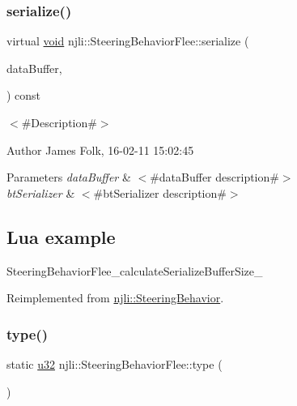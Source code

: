 \subsubsection{\texorpdfstring{serialize()}{serialize()}}
{\footnotesize\ttfamily virtual \mbox{\hyperlink{_thread_8h_af1e856da2e658414cb2456cb6f7ebc66}{void}} njli\+::\+Steering\+Behavior\+Flee\+::serialize (\begin{DoxyParamCaption}\item[{\mbox{\hyperlink{_thread_8h_af1e856da2e658414cb2456cb6f7ebc66}{void}} $\ast$}]{data\+Buffer,  }\item[{bt\+Serializer $\ast$}]{ }\end{DoxyParamCaption}) const\hspace{0.3cm}{\ttfamily [virtual]}}



$<$\#\+Description\#$>$ 

\begin{DoxyAuthor}{Author}
James Folk, 16-\/02-\/11 15\+:02\+:45
\end{DoxyAuthor}

\begin{DoxyParams}{Parameters}
{\em data\+Buffer} & $<$\#data\+Buffer description\#$>$ \\
\hline
{\em bt\+Serializer} & $<$\#bt\+Serializer description\#$>$\\
\hline
\end{DoxyParams}
\hypertarget{classnjli_1_1_steering_behavior_wander_ex1}{}\subsection{Lua example}\label{classnjli_1_1_steering_behavior_wander_ex1}

\begin{DoxyCodeInclude}
\end{DoxyCodeInclude}
Steering\+Behavior\+Flee\+\_\+calculate\+Serialize\+Buffer\+Size\+\_\+ 

Reimplemented from \mbox{\hyperlink{classnjli_1_1_steering_behavior_aa8494cb4a327c0040f64cfe8b393786e}{njli\+::\+Steering\+Behavior}}.

\mbox{\label{classnjli_1_1_steering_behavior_flee_a38a803a3d1269dd2c3ae09d1272156c8}} 
\subsubsection{\texorpdfstring{type()}{type()}}
{\footnotesize\ttfamily static \mbox{\hyperlink{_util_8h_a10e94b422ef0c20dcdec20d31a1f5049}{u32}} njli\+::\+Steering\+Behavior\+Flee\+::type (\begin{DoxyParamCaption}{ }\end{DoxyParamCaption})\hspace{0.3cm}{\ttfamily [static]}}



